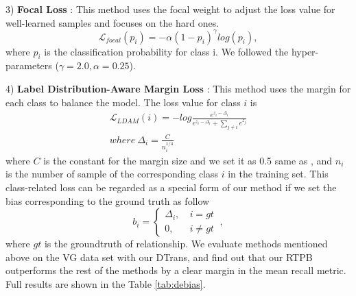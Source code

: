 \documentclass[letterpaper]{article} %
\begin{document}
3) \textbf{Focal Loss} \cite{Lin_2017_ICCV}: This method uses the focal weight to adjust the loss value for well-learned samples and focuses on the hard ones.
\begin{equation}
	\mathcal{L}_{focal}(p_i) = -\alpha(1-p_i)^\gamma log(p_i),
\end{equation}
where $p_i$ is the classification probability for class i. We followed the hyper-parameters ($\gamma = 2.0, \alpha= 0.25$). 

4) \textbf{Label Distribution-Aware Margin Loss} \cite{cao2019learning}: This method uses the margin for each class to balance the model. The loss value for class $i$ is
\begin{equation}
	\begin{split}
		\mathcal{L}_{LDAM}(i) = -log \frac{e^{z_i - \Delta_i}}{e^{z_i - \Delta_i} + \sum_{j\neq i}{e^{z_j}}} \\
		where ~ \Delta_i = \frac{C}{n_i^{1/4}}
	\end{split}
\end{equation}
where $C$ is the constant for the margin size and we set it as 0.5 same as \cite{cao2019learning}, and  $n_i$ is the number of sample of the corresponding class $i$ in the training set. This class-related loss can be regarded as a special form of our method if we set the bias corresponding to the ground truth as follow
\begin{equation}
	b_i =\left\{
	\begin{aligned}
		\Delta_i, ~ & i = gt   \\
		0, ~        & i\neq gt
	\end{aligned}
	\right.
	~,
\end{equation}
where $gt$ is the groundtruth of relationship.
We evaluate methods mentioned above on the VG data set\cite{krishna2016visual} with our DTrans, and find out that our RTPB outperforms the rest of the methods by a clear margin in the mean recall metric. Full results are shown in the Table \ref{tab:debias}.
\end{document}
